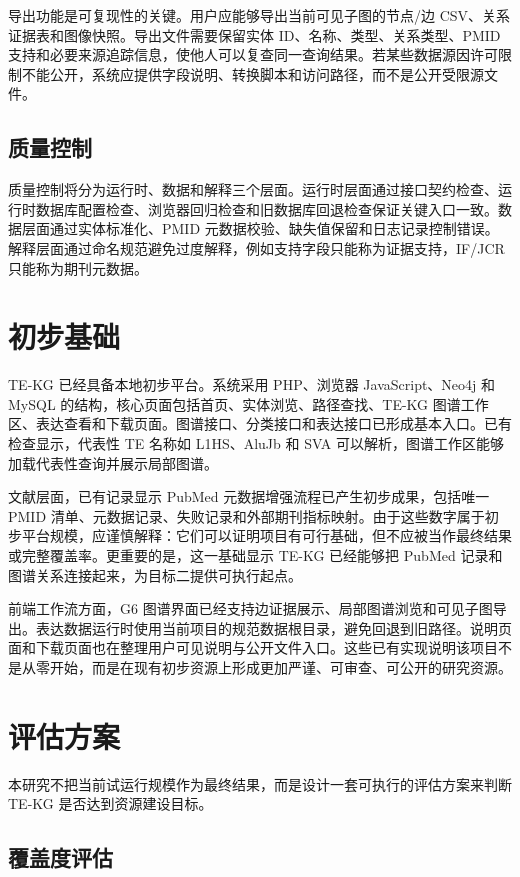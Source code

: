 \documentclass[12pt,a4paper,UTF8]{ctexart}
\begin{document}
导出功能是可复现性的关键。用户应能够导出当前可见子图的节点/边 CSV、关系证据表和图像快照。导出文件需要保留实体 ID、名称、类型、关系类型、PMID 支持和必要来源追踪信息，使他人可以复查同一查询结果。若某些数据源因许可限制不能公开，系统应提供字段说明、转换脚本和访问路径，而不是公开受限源文件。

\subsection{质量控制}

质量控制将分为运行时、数据和解释三个层面。运行时层面通过接口契约检查、运行时数据库配置检查、浏览器回归检查和旧数据库回退检查保证关键入口一致。数据层面通过实体标准化、PMID 元数据校验、缺失值保留和日志记录控制错误。解释层面通过命名规范避免过度解释，例如支持字段只能称为证据支持，IF/JCR 只能称为期刊元数据。

\section{初步基础}

TE-KG 已经具备本地初步平台。系统采用 PHP、浏览器 JavaScript、Neo4j 和 MySQL 的结构，核心页面包括首页、实体浏览、路径查找、TE-KG 图谱工作区、表达查看和下载页面。图谱接口、分类接口和表达接口已形成基本入口。已有检查显示，代表性 TE 名称如 L1HS、AluJb 和 SVA 可以解析，图谱工作区能够加载代表性查询并展示局部图谱。

文献层面，已有记录显示 PubMed 元数据增强流程已产生初步成果，包括唯一 PMID 清单、元数据记录、失败记录和外部期刊指标映射。由于这些数字属于初步平台规模，应谨慎解释：它们可以证明项目有可行基础，但不应被当作最终结果或完整覆盖率。更重要的是，这一基础显示 TE-KG 已经能够把 PubMed 记录和图谱关系连接起来，为目标二提供可执行起点。

前端工作流方面，G6 图谱界面已经支持边证据展示、局部图谱浏览和可见子图导出。表达数据运行时使用当前项目的规范数据根目录，避免回退到旧路径。说明页面和下载页面也在整理用户可见说明与公开文件入口。这些已有实现说明该项目不是从零开始，而是在现有初步资源上形成更加严谨、可审查、可公开的研究资源。

\section{评估方案}

本研究不把当前试运行规模作为最终结果，而是设计一套可执行的评估方案来判断 TE-KG 是否达到资源建设目标。

\subsection{覆盖度评估}
\end{document}

